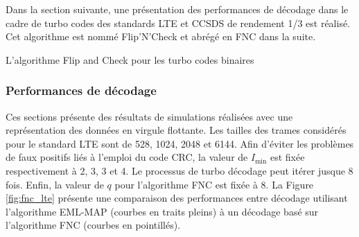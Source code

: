 Dans la section suivante, une présentation des performances de décodage dans le cadre de turbo codes des standards LTE
et CCSDS de rendement 1/3 est réalisé. Cet algorithme est nommé Flip'N'Check et abrégé en FNC dans la suite.

\begin{center}
\begin{minipage}{.86\textwidth}%
\begin{algorithm}[H]
\label{alg:fc_b}
	\DontPrintSemicolon
	
	\;
	\caption{L'algorithme Flip and Check pour les turbo codes binaires}
\end{algorithm}
\end{minipage}
\end{center}



\subsubsection{Performances de décodage}
Ces sections présente des résultats de simulations réalisées avec une représentation des données en virgule flottante.
Les tailles des trames considérés pour le standard LTE sont de 528, 1024, 2048 et 6144. Afin d'éviter les problèmes de
faux positifs liés à l'emploi du code CRC, la valeur de $I_\text{min}$ est fixée respectivement à 2, 3, 3 et 4. Le processus
de turbo décodage peut itérer jusque 8 fois. Enfin, la valeur de $q$ pour l'algorithme FNC est fixée à 8. La Figure 
\ref{fig:fnc_lte} présente une comparaison des performances entre décodage utilisant l'algorithme EML-MAP (courbes en 
traits pleins) à un décodage basé sur l'algorithme FNC (courbes en pointillés).


